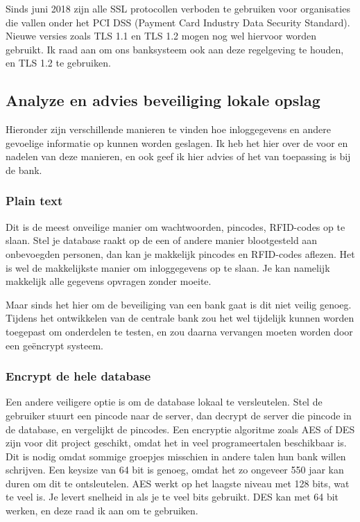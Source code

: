 \documentclass{article}
\begin{document}
Sinds juni 2018 zijn alle SSL protocollen verboden te gebruiken voor organisaties die vallen onder het PCI DSS (Payment Card Industry Data Security Standard).
Nieuwe versies zoals TLS 1.1 en TLS 1.2 mogen nog wel hiervoor worden gebruikt.
Ik raad aan om ons banksysteem ook aan deze regelgeving te houden, en TLS 1.2 te gebruiken.

\newpage

\subsection{Analyze en advies beveiliging lokale opslag} 

Hieronder zijn verschillende manieren te vinden hoe inloggegevens en andere gevoelige informatie op kunnen worden geslagen.
Ik heb het hier over de voor en nadelen van deze manieren, en ook geef ik hier advies of het van toepassing is bij de bank.

\subsubsection{Plain text}

Dit is de meest onveilige manier om wachtwoorden, pincodes, RFID-codes op te slaan.
Stel je database raakt op de een of andere manier blootgesteld aan onbevoegden personen, dan kan je makkelijk pincodes en RFID-codes aflezen. 
Het is wel de makkelijkste manier om inloggegevens op te slaan.
Je kan namelijk makkelijk alle gegevens opvragen zonder moeite.

Maar sinds het hier om de beveiliging van een bank gaat is dit niet veilig genoeg.
Tijdens het ontwikkelen van de centrale bank zou het wel tijdelijk kunnen worden toegepast om onderdelen te testen, en zou daarna vervangen moeten worden door een ge\"encrypt systeem.

\subsubsection{Encrypt de hele database}

Een andere veiligere optie is om de database lokaal te versleutelen.
Stel de gebruiker stuurt een pincode naar de server, dan decrypt de server die pincode in de database, en vergelijkt de pincodes.
Een encryptie algoritme zoals AES of DES zijn voor dit project geschikt, omdat het in veel programeertalen beschikbaar is.
Dit is nodig omdat sommige groepjes misschien in andere talen hun bank willen schrijven.
Een keysize van 64 bit is genoeg, omdat het zo ongeveer 550 jaar kan duren om dit te ontsleutelen.
AES werkt op het laagste niveau met 128 bits, wat te veel is.
Je levert snelheid in als je te veel bits gebruikt.
DES kan met 64 bit werken, en deze raad ik aan om te gebruiken.
\end{document}
